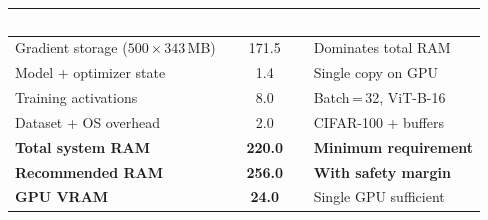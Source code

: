 \documentclass[11pt,a4paper]{article}
\begin{document}
\noindent
\begin{center}
\renewcommand{\arraystretch}{1.3}
\begin{tabular}{
  >{\raggedright\arraybackslash}p{6.5cm}
  S[table-format=3.1]
  >{\raggedright\arraybackslash}p{4.5cm}}
\toprule
{}
\textcolor{white}{\textbf{Component}} &
\textcolor{white}{\textbf{Size (GB)}} &
\textcolor{white}{\textbf{Notes}} \\
\midrule
Gradient storage ($500\times343$\,MB)
                        & 171.5 & Dominates total RAM \\
Model + optimizer state & 1.4   & Single copy on GPU \\
Training activations    & 8.0   & Batch\,=\,32, ViT-B-16 \\
Dataset + OS overhead   & 2.0   & CIFAR-100 + buffers \\
\midrule
\textbf{Total system RAM}    & \textbf{220.0} & \textbf{Minimum requirement} \\
\textbf{Recommended RAM}     & \textbf{256.0} & \textbf{With safety margin} \\
\midrule
\textbf{GPU VRAM}             & \textbf{24.0}  & Single GPU sufficient \\
\bottomrule
\end{tabular}
\end{center}
\end{document}
